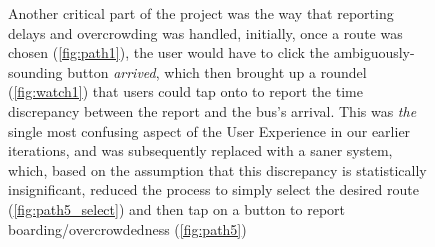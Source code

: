 \documentclass[a4paper, 11pt]{report}
\begin{document}
\begin{figure}[H]
{	}\hspace{0.5pt}
	\caption{
		Another critical part of the project was the way that reporting delays and overcrowding was handled, initially,
		once a route was chosen (\cref{fig:path1}), the user would have to click the ambiguously-sounding button \emph{arrived}, which
		then brought up a roundel (\cref{fig:watch1}) that users could tap onto to report the time discrepancy between the report and
		the bus's arrival. This was \emph{the} single most confusing aspect of the User Experience in our earlier iterations,
		and was subsequently replaced with a saner system, which, based on the assumption that this discrepancy is
		statistically insignificant, reduced the process to simply select the desired route (\cref{fig:path5_select}) and
		then tap on a button to report boarding/overcrowdedness (\cref{fig:path5})}\label{fig:path}
\end{figure}
\end{document}
